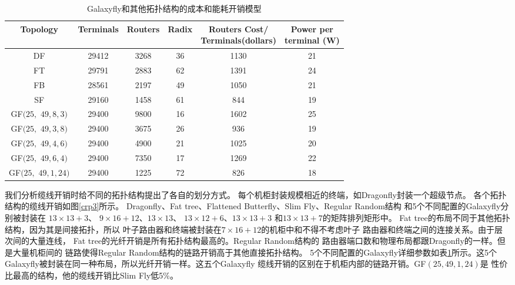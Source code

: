 \begin{table}[t]
\caption{Galaxyfly和其他拓扑结构的成本和能耗开销模型}
\centering
\begin{tabular}{c| c| c| c |c| c }\hline
 \centering
  Topology	& Terminals & Routers 	& Radix 	& \tabincell{c}{Routers Cost/\\Terminals(dollars)}	& \tabincell{c}{Power per \\terminal (W)} \\\hline
  DF & 29412 & 3268 & 36 & 1130 & 21 \\\hline
  FT & 29791 & 2883 &62 & 1391 & 24\\\hline
  FB & 28561 & 2197 &49 &1050 &21 \\\hline	
  SF & 29160 &1458 & 61 & 844 & 19\\\hline	
  \tabincell{c}{GF$(25,$\\$49,8,3)$} &29400 &9800 &16 &1602 &25 \\\hline
  \tabincell{c}{GF$(25,$\\$49,3,8)$}	&29400 &3675 &26 &936 &19 \\\hline
  \tabincell{c}{GF$(25,$\\$49,4,6)$} &29400 &4900 &21 &1025 &20 \\\hline
  \tabincell{c}{GF$(25,$\\$49,6,4)$}&29400 &7350 &17 &1269 &22 \\\hline
  \tabincell{c}{GF$(25,$\\$49,1,24)$}&29400 &1225 &72 &826 &18 \\\hline
\end{tabular}
 \label{Table7}
\end{table}
我们分析缆线开销时给不同的拓扑结构提出了各自的划分方式。
每个机柜封装规模相近的终端，如Dragonfly封装一个超级节点。
各个拓扑结构的缆线开销如图\ref{crp3}所示。
Dragonfly、Fat tree、Flattened Butterfly、Slim Fly、Regular Random结构
和5个不同配置的Galaxyfly分别被封装在
$13\times13+3$、 $9\times16+12$、$13\times13$、
$13\times12+6$、$13\times13+3$ 和$13\times13+7$的矩阵排列矩形中。
Fat tree的布局不同于其他拓扑结构，因为其是间接拓扑，所以
叶子路由器和终端被封装在$7\times 16+12$的机柜中和不得不考虑叶子
路由器和终端之间的连接关系。由于层次间的大量连线，
Fat tree的光纤开销是所有拓扑结构最高的。Regular Random结构的
路由器端口数和物理布局都跟Dragonfly的一样。但是大量机柜间的
链路使得Regular Random结构的链路开销高于其他直接拓扑结构。
5个不同配置的Galaxyfly详细参数如表\ref{Table7}所示。这5个
Galaxyfly被封装在同一种布局，所以光纤开销一样。这五个Galaxyfly
缆线开销的区别在于机柜内部的链路开销。GF$(25,49,1,24)$是
性价比最高的结构，他的缆线开销比Slim Fly低5\%。

